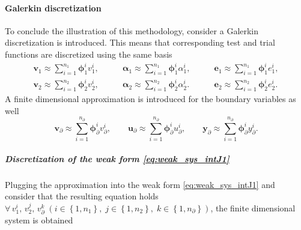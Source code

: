 \paragraph{Galerkin discretization}
To conclude the illustration of this methodology, consider a Galerkin discretization is introduced. This means that corresponding test and trial functions are discretized using the same basis
\begin{equation}\label{eq:approx_ve}
\begin{aligned}
\bm{v}_1 \approx \sum_{i=1}^{n_1} \bm{\phi}_1^i v_1^i, \\
\bm{v}_2 \approx \sum_{i=1}^{n_2} \bm{\phi}_2^i v_2^i, 
\end{aligned} \qquad 
\begin{aligned}
\bm{\alpha}_1 \approx \sum_{i=1}^{n_1} \bm{\phi}_1^i \alpha_1^i, \\
\bm{\alpha}_2 \approx \sum_{i=1}^{n_2} \bm{\phi}_2^i \alpha_2^i. 
\end{aligned} \qquad 
\begin{aligned}
\bm{e}_1 \approx \sum_{i=1}^{n_1} \bm{\phi}_1^i e_1^i, \\
\bm{e}_2 \approx \sum_{i=1}^{n_2} \bm{\phi}_2^i e_2^i. 
\end{aligned}
\end{equation}
A finite dimensional approximation is introduced for the boundary variables as well
\begin{equation}\label{eq:approx_boundar}
\bm{v}_\partial \approx \sum_{i=1}^{n_\partial} \bm{\phi}_\partial^i v_\partial^i, \qquad
\bm{u}_\partial \approx \sum_{i=1}^{n_\partial} \bm{\phi}_\partial^i u_\partial^i, \qquad
\bm{y}_\partial \approx \sum_{i=1}^{n_\partial} \bm{\phi}_\partial^i y_\partial^i.
\end{equation}
\subparagraph{Discretization of the weak form \eqref{eq:weak_sys_intJ1}}
Plugging the approximation into the weak form \eqref{eq:weak_sys_intJ1} and consider that the resulting equation holds $\forall \, v_1^i,\, v_2^j,\, v_\partial^k \; (i\in\left\{1,n_1\right\}, \; j\in\left\{1,n_2\right\}, \; k\in\left\{1,n_\partial\right\})$, the finite dimensional system is obtained

